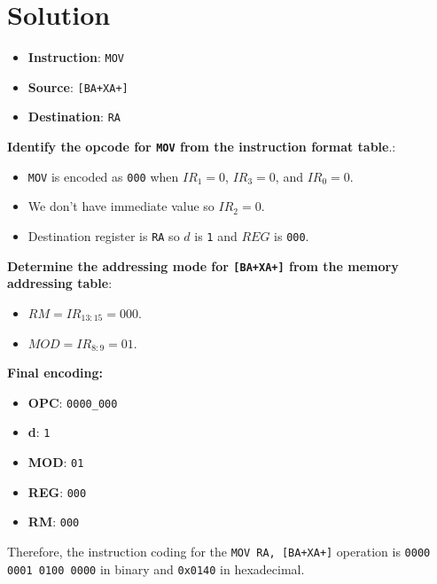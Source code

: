 \section*{Solution}

\begin{itemize}
    \item \textbf{Instruction}: \texttt{MOV}
    \item \textbf{Source}: \texttt{[BA+XA+]}
    \item \textbf{Destination}: \texttt{RA}
\end{itemize}

\textbf{Identify the opcode for \texttt{MOV} from the instruction format table}.:
\begin{itemize}
    \item \texttt{MOV} is encoded as \texttt{000} when $IR_{1}=0$, $IR_{3}=0$, and $IR_{0}=0$.
    \item We don't have immediate value so $IR_{2}=0$.
    \item Destination register is \texttt{RA} so $d$ is \texttt{1} and $REG$ is \texttt{000}.
\end{itemize}

\textbf{Determine the addressing mode for \texttt{[BA+XA+]} from the memory addressing table}:
\begin{itemize}
    \item $RM=IR_{13:15}=000$.
    \item $MOD=IR_{8:9}=01$.
\end{itemize}

\textbf{Final encoding:}
\begin{itemize}
    \item \textbf{OPC}: \texttt{0000\_000}
    \item \textbf{d}: \texttt{1}
    \item \textbf{MOD}: \texttt{01}
    \item \textbf{REG}: \texttt{000}
    \item \textbf{RM}: \texttt{000}
\end{itemize}

Therefore, the instruction coding for the \texttt{MOV RA, [BA+XA+]} operation is \texttt{0000 0001 0100 0000} in binary and \texttt{0x0140} in hexadecimal.